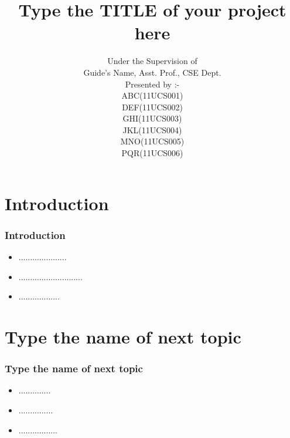 \documentclass[]{beamer}
\title{Type the TITLE of your project here}    %
\author{Under the Supervision of \\ Guide's Name, Asst. Prof., CSE Dept. \\ Presented by :- \\ ABC(11UCS001) \\ DEF(11UCS002)\\ GHI(11UCS003) \\ JKL(11UCS004) \\ MNO(11UCS005) \\ PQR(11UCS006)}
\begin{document}
\begin{frame}
  \titlepage
\end{frame}

\section[Outline]{}

\begin{frame}
  \tableofcontents
\end{frame}


\section{Introduction}
\begin{frame}
  \frametitle{Introduction}   %

\begin{itemize}
\item  .....................
\item  ............................
\item  ..................
\end{itemize}
\end{frame}


\section{Type the name of next topic}
\begin{frame}
\frametitle{Type the name of next topic}
\begin{itemize}
\item ..............
\item ...............
\item ................. 
\end{itemize}
\end{frame}
\end{document}
